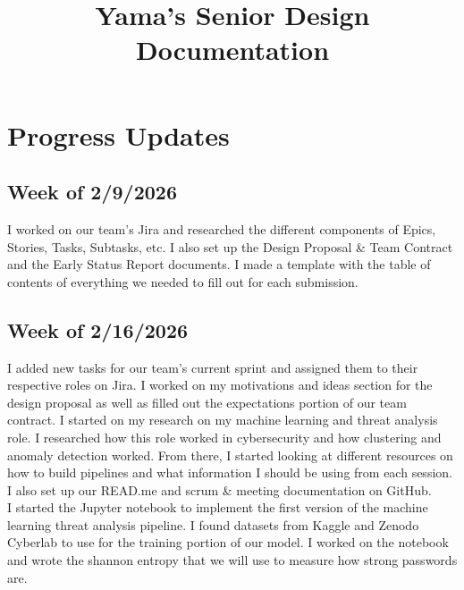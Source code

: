 \documentclass{article}
\title{Yama's Senior Design Documentation}
\date{}
\begin{document}
\maketitle
\tableofcontents
\newpage

\section{Progress Updates}
\subsection{Week of 2/9/2026}
I worked on our team's Jira and researched the different components of Epics, Stories, Tasks, Subtasks, etc. I also set up the Design Proposal \& Team Contract and the Early Status Report documents. I made a template with the table of contents of everything we needed to fill out for each submission.
\subsection{Week of 2/16/2026}
I added new tasks for our team's current sprint and assigned them to their respective roles on Jira. I worked on my motivations and ideas section for the design proposal as well as filled out the expectations portion of our team contract. I started on my research on my machine learning and threat analysis role. I researched how this role worked in cybersecurity and how clustering and anomaly detection worked. From there, I started looking at different resources on how to build pipelines and what information I should be using from each session. I also set up our READ.me and scrum \& meeting documentation on GitHub.
\\I started the Jupyter notebook to implement the first version of the machine learning threat analysis pipeline. I found datasets from Kaggle and Zenodo Cyberlab to use for the training portion of our model. I worked on the notebook and wrote the shannon entropy that we will use to measure how strong passwords are. 
\end{document}
